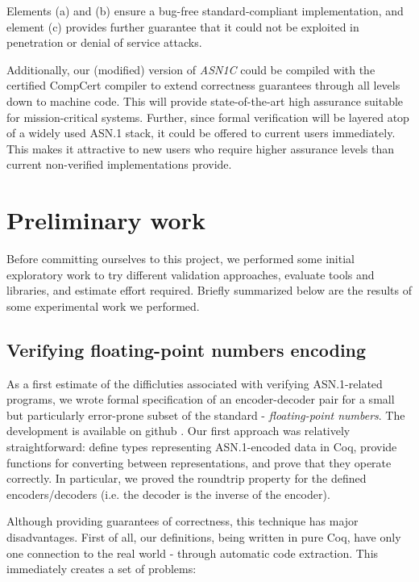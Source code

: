 \documentclass[acmsmall,nonacm]{acmart}
\begin{document}
Elements (a) and (b) ensure a bug-free standard-compliant implementation, and
element (c) provides further guarantee that it could not be exploited
in penetration or denial of service attacks.

Additionally, our (modified) version of \emph{ASN1C} could be compiled with
the certified CompCert compiler \cite{CompCert} to extend correctness
guarantees through all levels down to machine code. This will provide state-of-the-art high
assurance suitable for mission-critical systems. Further, since formal
verification will be layered atop of a widely used ASN.1 stack, it
could be offered to current users immediately. This makes it attractive to new users who require higher
assurance levels than current non-verified implementations provide.

\section{Preliminary work}

Before committing ourselves to this project, we performed some initial
exploratory work to try different validation approaches, evaluate
tools and libraries, and estimate effort required. Briefly summarized
below are the results of some experimental work we performed.

\subsection{Verifying floating-point numbers encoding}

As a first estimate of the difficluties associated with verifying
ASN.1-related programs, we wrote formal specification of an
encoder-decoder pair for a small but particularly error-prone subset
of the standard - \textit{floating-point numbers}. The development is
available on github \cite{asn1fpcoq}. Our first approach was
relatively straightforward: define types representing ASN.1-encoded
data in Coq, provide functions for converting between representations,
and prove that they operate correctly. In particular, we proved the
roundtrip property for the defined encoders/decoders (i.e. the decoder is the inverse of the encoder).

Although providing guarantees of correctness, this technique has major disadvantages.
First of all, our definitions, being written in pure Coq, have only one
connection to the real world - through automatic code extraction.
This immediately creates a set of problems:
\end{document}
